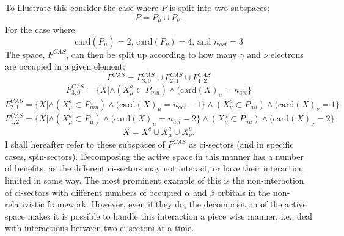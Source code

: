 \noindent To illustrate this consider the case where $P$ is split into two subspaces;
\begin{equation}
P = P_{\mu} \cup  P_{\nu}.
\end{equation}
For the case where
\begin{equation*}
\text{card}(P_{\mu}) = 2 
\text{, \ \ \ }
\text{card}(P_{\nu}) = 4
\text{, \ \ \ and \ \ \ }
n_{act} = 3
\end{equation*}
\noindent The space, $F^{CAS}$, can then be split up according to how many $\gamma$ and $\nu$
electrons are occupied in a given element;
\begin{equation*}
F^{CAS} = F^{CAS}_{3,0} \cup F^{CAS}_{2,1} \cup F^{CAS}_{1,2} 
\end{equation*}
\begin{equation*}
F^{CAS}_{3,0} = \{ X | \wedge (X^{a}_{\mu} \subset P_{mu}) \wedge ( \text{card}(X)_{\mu} = n_{act} \}
\end{equation*}
\begin{equation*}
F^{CAS}_{2,1} = \{ X | \wedge (X^{a}_{\mu} \subset P_{mu}) \wedge ( \text{card}(X)_{\mu} = n_{act}-1 \}
                       \wedge (X^{a}_{\nu} \subset P_{nu}) \wedge ( \text{card}(X)_{\nu} = 1 \}
\end{equation*}
\begin{equation*}
F^{CAS}_{1,2} = \{ X | \wedge (X^{a}_{\mu} \subset P_{\mu}) \wedge ( \text{card}(X)_{\mu} = n_{act}-2 \}
                       \wedge (X^{a}_{\nu} \subset P_{nu}) \wedge ( \text{card}(X)_{\nu} = 2 \}
\end{equation*}
\begin{equation*}
X = X^{c} \cup X^{a}_{\mu} \cup X^{a}_{\nu}.
\end{equation*}
\noindent I shall hereafter refer to these subspaces of $F^{CAS}$ as
ci-sectors (and in specific cases, spin-sectors). Decomposing the active space in
this manner has a number of benefits, as the different ci-sectors may not interact,
or have their interaction limited in some way.
The most prominent example of this is the non-interaction
of ci-sectors with different numbers of occupied $\alpha$ and $\beta$ orbitals 
in the non-relativistic framework.  However, even if they do,
the decomposition of the active space makes it is possible to handle
this interaction a piece wise manner, i.e., deal with interactions
between two ci-sectors at a time.

